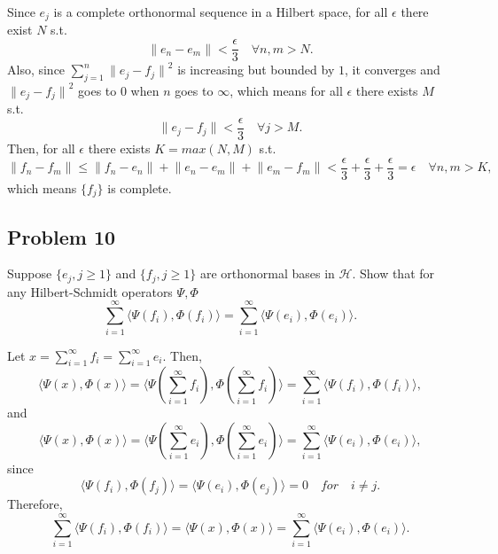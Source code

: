 \documentclass{article}
\theoremstyle{definition}
\numberwithin{equation}{section}
\begin{document}
\begin{mysol}
Since ${e_{j}}$ is a complete orthonormal sequence in a Hilbert space, for all $\epsilon$ there exist $N$ s.t.
$$ \lVert e_{n} - e_{m}\rVert < \frac{\epsilon}{3} \quad \forall n, m > N .$$
Also, since $\sum_{j=1}^{n}  {\lVert e_{j} - f_{j}\rVert}^{2} $ is increasing but bounded by $1$,
it converges and $ {\lVert e_{j} - f_{j}\rVert}^{2} $ goes to $0$ when $n$ goes to $\infty$, which means for all $\epsilon$ there exists $M$ s.t.
$$ \lVert e_{j} - f_{j}\rVert < \frac{\epsilon}{3} \quad \forall j > M .$$
Then, for all $\epsilon$ there exists $K = max(N, M)$ s.t.
$$ \lVert f_{n} - f_{m}\rVert \leq 
\lVert f_{n} - e_{n}\rVert + \lVert e_{n} - e_{m}\rVert + \lVert e_{m} - f_{m}\rVert
< \frac{\epsilon}{3} + \frac{\epsilon}{3} + \frac{\epsilon}{3} = \epsilon \quad \forall n, m > K ,$$
which means $\{f_{j}\}$ is complete.

\end{mysol}

\subsection{Problem 10}

\begin{problem}
Suppose $\{e_{j}, j \geq 1 \}$ and $\{f_{j}, j \geq 1 \}$ are orthonormal bases in $\mathcal{H}$.
Show that for any Hilbert-Schmidt operators $\Psi, \Phi$
$$\sum_{i=1}^{\infty} \langle \Psi(f_{i}), \Phi(f_{i}) \rangle = 
\sum_{i=1}^{\infty} \langle \Psi(e_{i}), \Phi(e_{i}) \rangle .$$
\end{problem}

\begin{mysol}
Let $x = \sum_{i=1}^{\infty} f_{i} = \sum_{i=1}^{\infty} e_{i}$.
Then, $$\langle \Psi(x), \Phi(x) \rangle = 
\langle \Psi(\sum_{i=1}^{\infty} f_{i}), \Phi(\sum_{i=1}^{\infty} f_{i}) \rangle
= \sum_{i=1}^{\infty} \langle \Psi(f_{i}), \Phi(f_{i}) \rangle,
$$
and
$$\langle \Psi(x), \Phi(x) \rangle = 
\langle \Psi(\sum_{i=1}^{\infty} e_{i}), \Phi(\sum_{i=1}^{\infty} e_{i}) \rangle
= \sum_{i=1}^{\infty} \langle \Psi(e_{i}), \Phi(e_{i}) \rangle,
$$
since
$$ \langle \Psi(f_{i}), \Phi(f_{j}) \rangle = \langle \Psi(e_{i}), \Phi(e_{j}) \rangle
= 0 \quad for \quad i \neq j .$$
Therefore,
$$\sum_{i=1}^{\infty} \langle \Psi(f_{i}), \Phi(f_{i}) \rangle = 
\langle \Psi(x), \Phi(x) \rangle = 
\sum_{i=1}^{\infty} \langle \Psi(e_{i}), \Phi(e_{i}) \rangle .$$




\end{mysol}
\end{document}
